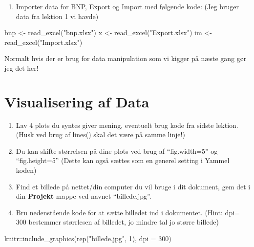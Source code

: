 \documentclass[
  12pt,
]{article}
\newenvironment{Shaded}{\begin{snugshade}}{\end{snugshade}}
\newcommand{\AttributeTok}[1]{\textcolor[rgb]{0.77,0.63,0.00}{#1}}
\newcommand{\DecValTok}[1]{\textcolor[rgb]{0.00,0.00,0.81}{#1}}
\newcommand{\FunctionTok}[1]{\textcolor[rgb]{0.00,0.00,0.00}{#1}}
\newcommand{\NormalTok}[1]{#1}
\newcommand{\OtherTok}[1]{\textcolor[rgb]{0.56,0.35,0.01}{#1}}
\newcommand{\SpecialCharTok}[1]{\textcolor[rgb]{0.00,0.00,0.00}{#1}}
\newcommand{\StringTok}[1]{\textcolor[rgb]{0.31,0.60,0.02}{#1}}
\providecommand{\tightlist}{%
  \setlength{\itemsep}{0pt}\setlength{\parskip}{0pt}}
\begin{document}
\begin{enumerate}
\def\labelenumi{\arabic{enumi}.}
\tightlist
\item
  Importer data for BNP, Export og Import med følgende kode: (Jeg bruger
  data fra lektion 1 vi havde)
\end{enumerate}

\begin{Shaded}
\begin{Highlighting}[]
\NormalTok{bnp }\OtherTok{\textless{}{-}} \FunctionTok{read\_excel}\NormalTok{(}\StringTok{"bnp.xlsx"}\NormalTok{)}
\NormalTok{x }\OtherTok{\textless{}{-}} \FunctionTok{read\_excel}\NormalTok{(}\StringTok{"Export.xlsx"}\NormalTok{)}
\NormalTok{im }\OtherTok{\textless{}{-}} \FunctionTok{read\_excel}\NormalTok{(}\StringTok{"Import.xlsx"}\NormalTok{)}
\end{Highlighting}
\end{Shaded}

Normalt hvis der er brug for data manipulation som vi kigger på næste
gang gør jeg det her!

\hypertarget{visualisering-af-data}{%
\section{Visualisering af Data}\label{visualisering-af-data}}

\begin{enumerate}
\def\labelenumi{\arabic{enumi}.}
\item
  Lav 4 plots du syntes giver mening, eventuelt brug kode fra sidste
  lektion. (Husk ved brug af lines() skal det være på samme linje!)
\item
  Du kan skifte størrelsen på dine plots ved brug af ``fig.width=5'' og
  ``fig.height=5'' (Dette kan også sættes som en generel setting i
  Yammel koden)
\item
  Find et billede på nettet/din computer du vil bruge i dit dokument,
  gem det i din \textbf{Projekt} mappe ved navnet ``billede.jpg''.
\item
  Bru nedenstående kode for at sætte billedet ind i dokumentet. (Hint:
  dpi= 300 bestemmer størrlesen af billedet, jo mindre tal jo større
  billede)
\end{enumerate}

\begin{Shaded}
\begin{Highlighting}[]
\NormalTok{knitr}\SpecialCharTok{::}\FunctionTok{include\_graphics}\NormalTok{(}\FunctionTok{rep}\NormalTok{(}\StringTok{"billede.jpg"}\NormalTok{, }\DecValTok{1}\NormalTok{), }\AttributeTok{dpi =} \DecValTok{300}\NormalTok{)}
\end{Highlighting}
\end{Shaded}


  
\end{document}

